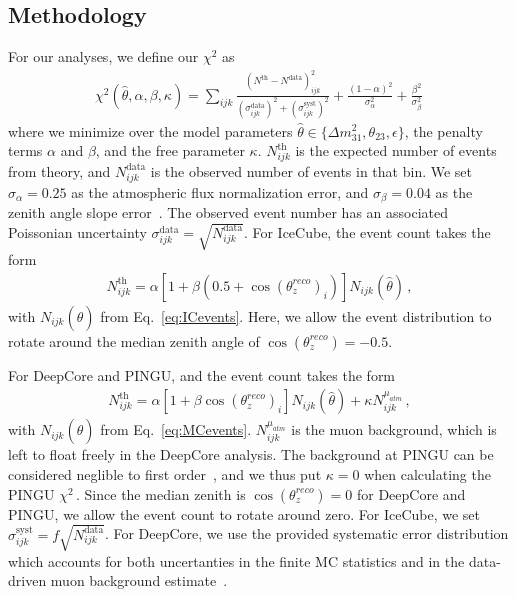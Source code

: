 \documentclass[draft=True]{revtex4-2}
\newcommand{\zreco}{\ensuremath{\cos{(\theta_z^{reco})}}}
\newcommand{\dm}{\Delta m^2_{31}}
\begin{document}
\subsection{Methodology}
For our analyses, we define our $\chi^2$ as
\begin{align} \label{eq:chisq}
    \chi^{2}(\hat{\theta},\alpha,\beta, \kappa)=\sum_{ijk} \frac{\left(N^\text{th}-N^\text{data}\right)_{ijk}^{2}}
    {\left(\sigma^\text{data}_{ijk}\right)^{2} + \left(\sigma^\text{syst}_{ijk}\right)^{2}}+ 
    \frac{(1-\alpha)^2}{\sigma_\alpha^2} + \frac{\beta^2}{\sigma_\beta^2}\,
\end{align}
where we minimize over the model parameters $\hat{\theta} \in \{\dm, \theta_{23}, \epsilon\}$, the penalty terms $\alpha$ and $\beta$, and the free parameter $\kappa$.
$N_{ijk}^\text{th}$ is the expected number of events from theory, and $N_{ijk}^\text{data}$ is the observed number of events in that bin. We set $\sigma_\alpha = 0.25$ as the atmospheric flux normalization error, and $\sigma_\beta = 0.04$ as the zenith angle slope error~\cite{hondapaper}. 
The observed event number has an associated Poissonian uncertainty $\sigma_{ijk}^\text{data} = \sqrt{N_{ijk}^\text{data}}$.
For IceCube, the event count takes the form
\begin{align}
    N^\text{th}_{ijk} = \alpha\left[1+\beta (0.5 + \zreco_i )\right] N_{ijk}(\hat{\theta})\,,
\end{align}
with $N_{ijk}(\hat{\theta})$ from Eq.~\ref{eq:ICevents}. Here, we allow the event distribution to rotate around the median zenith angle of $\zreco = -0.5$.

For DeepCore and PINGU, and the event count takes the form
\begin{align}
    N^\text{th}_{ijk} = \alpha\left[1+\beta \zreco_i \right] N_{ijk}(\hat{\theta}) + \kappa N_{ijk}^{\mu_{atm}}\,,
\end{align}
with $N_{ijk}(\hat{\theta})$ from Eq.~\ref{eq:MCevents}. $N_{ijk}^{\mu_{atm}}$ is the muon background, which is left to float freely in the DeepCore analysis.
The background at PINGU can be considered neglible to first order~\cite{PINGUdata}, and we thus put $\kappa=0$ when calculating the PINGU $\chi^2$\,. 
Since the median zenith is $\zreco = 0$ for DeepCore and PINGU, we allow the event count to rotate around zero.
For IceCube, we set $\sigma_{ijk}^\text{syst} = f\sqrt{N_{ijk}^\text{data}}$. %
For DeepCore, we use the provided systematic error distribution which accounts for both uncertanties in the finite MC statistics and in the data-driven 
muon background estimate~\cite{DC2019data}. %
\end{document}
